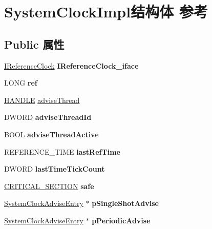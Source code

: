 \hypertarget{struct_system_clock_impl}{}\section{System\+Clock\+Impl结构体 参考}
\label{struct_system_clock_impl}
\subsection*{Public 属性}
\begin{DoxyCompactItemize}
\item 
\mbox{\label{struct_system_clock_impl_ae7368c78811e359e277186bce0b42b31}} 
\hyperlink{interface_i_reference_clock}{I\+Reference\+Clock} {\bfseries I\+Reference\+Clock\+\_\+iface}
\item 
\mbox{\label{struct_system_clock_impl_ad438af5120d0f1a1e124e163b36ec014}} 
L\+O\+NG {\bfseries ref}
\item 
\hyperlink{interfacevoid}{H\+A\+N\+D\+LE} \hyperlink{struct_system_clock_impl_a2df1a6a4c11cbffcade7c93d44ca6b72}{advise\+Thread}
\item 
\mbox{\label{struct_system_clock_impl_a69e19699448e225535f543a24c6303e7}} 
D\+W\+O\+RD {\bfseries advise\+Thread\+Id}
\item 
\mbox{\label{struct_system_clock_impl_a37027fdd6a52906ea9f181d2848a41d5}} 
B\+O\+OL {\bfseries advise\+Thread\+Active}
\item 
\mbox{\label{struct_system_clock_impl_aec7d689bb6763ac8b0c4a16b866d2124}} 
R\+E\+F\+E\+R\+E\+N\+C\+E\+\_\+\+T\+I\+ME {\bfseries last\+Ref\+Time}
\item 
\mbox{\label{struct_system_clock_impl_adf51f1b9ace31455392b21d48837cbfc}} 
D\+W\+O\+RD {\bfseries last\+Time\+Tick\+Count}
\item 
\mbox{\label{struct_system_clock_impl_a55aab9b5f5ab5191513b4b5671a6eee1}} 
\hyperlink{struct___c_r_i_t_i_c_a_l___s_e_c_t_i_o_n}{C\+R\+I\+T\+I\+C\+A\+L\+\_\+\+S\+E\+C\+T\+I\+ON} {\bfseries safe}
\item 
\mbox{\label{struct_system_clock_impl_acff8e9fc6c9de5f6bb475f94d98a9b4e}} 
\hyperlink{struct_system_clock_advise_entry}{System\+Clock\+Advise\+Entry} $\ast$ {\bfseries p\+Single\+Shot\+Advise}
\item 
\mbox{\label{struct_system_clock_impl_a9e1eea83d087b016c973bc53dcea0b65}} 
\hyperlink{struct_system_clock_advise_entry}{System\+Clock\+Advise\+Entry} $\ast$ {\bfseries p\+Periodic\+Advise}
\end{DoxyCompactItemize}


